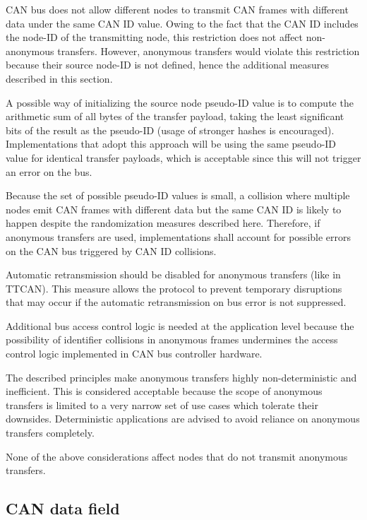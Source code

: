 \begin{remark}[breakable]
    CAN bus does not allow different nodes to transmit CAN frames with different data under the same CAN ID value.
    Owing to the fact that the CAN ID includes the node-ID of the transmitting node,
    this restriction does not affect non-anonymous transfers.
    However, anonymous transfers would violate this restriction because their source node-ID is not defined,
    hence the additional measures described in this section.

    A possible way of initializing the source node pseudo-ID value is to compute the arithmetic sum
    of all bytes of the transfer payload, taking the least significant bits of the result as the pseudo-ID
    (usage of stronger hashes is encouraged).
    Implementations that adopt this approach will be using the same pseudo-ID value for identical transfer payloads,
    which is acceptable since this will not trigger an error on the bus.

    Because the set of possible pseudo-ID values is small,
    a collision where multiple nodes emit CAN frames with different data but the same CAN ID is likely to happen
    despite the randomization measures described here.
    Therefore, if anonymous transfers are used,
    implementations shall account for possible errors on the CAN bus triggered by CAN ID collisions.

    Automatic retransmission should be disabled for anonymous transfers (like in TTCAN).
    This measure allows the protocol to prevent temporary disruptions that may occur if the automatic
    retransmission on bus error is not suppressed.

    Additional bus access control logic is needed at the application level because
    the possibility of identifier collisions in anonymous frames undermines the access control logic implemented
    in CAN bus controller hardware.

    The described principles make anonymous transfers highly non-deterministic and inefficient.
    This is considered acceptable because the scope of anonymous transfers is limited to a very narrow set of use
    cases which tolerate their downsides.
    Deterministic applications are advised to avoid reliance on anonymous transfers completely.

    None of the above considerations affect nodes that do not transmit anonymous transfers.
\end{remark}

\subsection{CAN data field}


